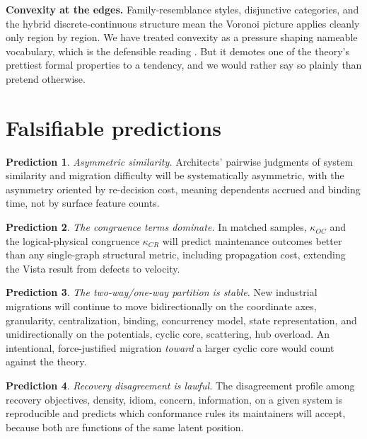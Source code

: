 \documentclass[11pt,oneside]{article}
\theoremstyle{definition}
\newtheorem{pred}{Prediction}
\begin{document}
\textbf{Convexity at the edges.} Family-resemblance styles, disjunctive categories, and the
hybrid discrete-continuous structure mean the Voronoi picture applies cleanly only region by
region. We have treated convexity as a pressure shaping nameable vocabulary, which is the
defensible reading \cite{jager2007,hernandez2017}. But it demotes one of the theory's prettiest
formal properties to a tendency, and we would rather say so plainly than pretend otherwise.

\section{Falsifiable predictions}

\begin{pred}
\emph{Asymmetric similarity.} Architects' pairwise judgments of system similarity and migration
difficulty will be systematically asymmetric, with the asymmetry oriented by re-decision cost,
meaning dependents accrued and binding time, not by surface feature counts.
\end{pred}

\begin{pred}
\emph{The congruence terms dominate.} In matched samples, $\kappa_{OC}$ and the
logical-physical congruence $\kappa_{CR}$ will predict maintenance outcomes better than any
single-graph structural metric, including propagation cost, extending the Vista result
\cite{nagappan2008} from defects to velocity.
\end{pred}

\begin{pred}
\emph{The two-way/one-way partition is stable.} New industrial migrations will continue to move
bidirectionally on the coordinate axes, granularity, centralization, binding, concurrency
model, state representation, and unidirectionally on the potentials, cyclic core, scattering,
hub overload. An intentional, force-justified migration \emph{toward} a larger cyclic core
would count against the theory.
\end{pred}

\begin{pred}
\emph{Recovery disagreement is lawful.} The disagreement profile among recovery objectives,
density, idiom, concern, information, on a given system is reproducible and predicts which
conformance rules its maintainers will accept, because both are functions of the same latent
position.
\end{pred}
\end{document}
